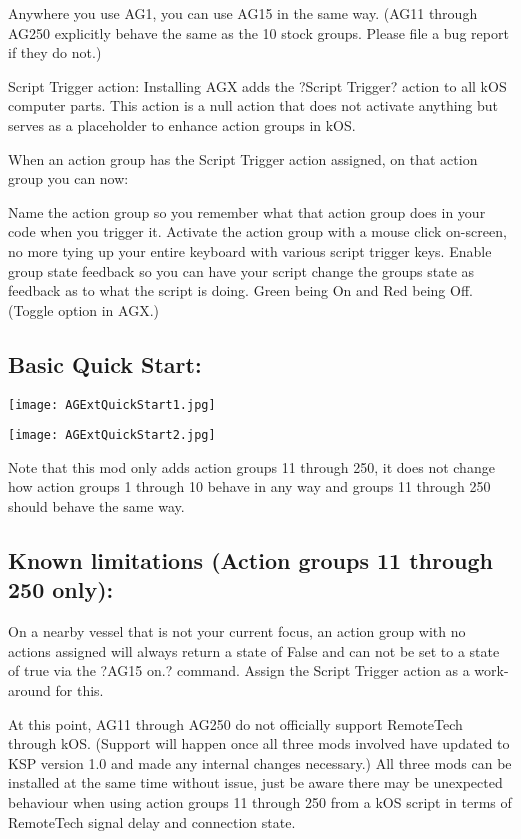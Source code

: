 Anywhere you use AG1, you can use AG15 in the same way. (AG11 through AG250 explicitly behave the same as the 10 stock groups. Please file a bug report if they do not.)

Script Trigger action: Installing AGX adds the ?Script Trigger? action to all kOS computer parts. This action is a null action that does not activate anything but serves as a placeholder to enhance action groups in kOS.

When an action group has the Script Trigger action assigned, on that action group you can now:

Name the action group so you remember what that action group does in your code when you trigger it.
Activate the action group with a mouse click on-screen, no more tying up your entire keyboard with various script trigger keys.
Enable group state feedback so you can have your script change the groups state as feedback as to what the script is doing. Green being On and Red being Off. (Toggle option in AGX.)

\subsection{Basic Quick Start:}

\begin{center}
\texttt{[image: AGExtQuickStart1.jpg]}
\end{center}

\begin{center}
\texttt{[image: AGExtQuickStart2.jpg]}
\end{center}

Note that this mod only adds action groups 11 through 250, it does not change how action groups 1 through 10 behave in any way and groups 11 through 250 should behave the same way.

\subsection{Known limitations (Action groups 11 through 250 only):}

On a nearby vessel that is not your current focus, an action group with no actions assigned will always return a state of False and can not be set to a state of true via the ?AG15 on.? command. Assign the Script Trigger action as a work-around for this.

At this point, AG11 through AG250 do not officially support RemoteTech through kOS. (Support will happen once all three mods involved have updated to KSP version 1.0 and made any internal changes necessary.) All three mods can be installed at the same time without issue, just be aware there may be unexpected behaviour when using action groups 11 through 250 from a kOS script in terms of RemoteTech signal delay and connection state.

